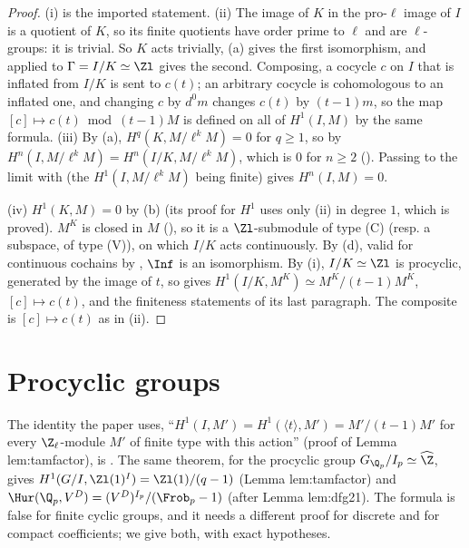 \begin{proof}
(i) is the imported statement. (ii) The image of $K$ in the pro-$\ell$ image of $I$ is a quotient of $K$, so its finite quotients have order prime to $\ell$
and are $\ell$-groups: it is trivial. So $K$ acts trivially, (a) gives the first isomorphism, and
 applied to $\Gamma=I/K\simeq\Zl$ gives the second. Composing, a cocycle $c$ on $I$ that is inflated from $I/K$ is sent to
$c(t)$; an arbitrary cocycle is cohomologous to an inflated one, and changing $c$ by $d^0m$ changes $c(t)$ by $(t-1)m$, so the map $[c]\mapsto c(t)\bmod(t-1)M$ is
defined on all of $H^1(I,M)$ by the same formula. (iii) By (a), $H^q(K,M/\ell^kM)=0$ for $q\ge1$, so by
 $H^n(I,M/\ell^kM)=H^n(I/K,M/\ell^kM)$, which is $0$ for $n\ge2$ (). Passing to the limit
with  (the $H^1(I,M/\ell^kM)$ being finite) gives $H^n(I,M)=0$.

(iv) $H^1(K,M)=0$ by (b) (its proof for $H^1$ uses only (ii) in degree $1$, which is proved). $M^K$ is closed in $M$
(), so it is a $\Zl$-submodule of type (C) (resp. a subspace, of type (V)), on which $I/K$ acts continuously. By
(d), valid for continuous cochains by , $\Inf$ is an isomorphism. By (i), $I/K\simeq\Zl$ is procyclic,
generated by the image of $t$, so  gives $H^1(I/K,M^K)\simeq M^K/(t-1)M^K$, $[c]\mapsto c(t)$, and the finiteness statements of its last
paragraph. The composite is $[c]\mapsto c(t)$ as in (ii).
\end{proof}

\section{Procyclic groups}\label{sec:cohomology:procyclic}

The identity the paper uses, ``$H^1(I,M')=H^1(\langle t\rangle,M')=M'/(t-1)M'$ for every $\Z_\ell$-module $M'$ of finite type with this action'' (proof of Lemma
lem:tamfactor), is . The same theorem, for the procyclic group $G_{\Q_p}/I_p\simeq\widehat\Z$, gives
$H^1(G/I,\Zl(1)^I)=\Zl(1)/(q-1)$ (Lemma lem:tamfactor) and $\Hur(\Q_p,V^D)=(V^D)^{I_p}/(\Frob_p-1)$ (after Lemma lem:dfg21). The formula is false for finite
cyclic groups, and it needs a different proof for discrete and for compact coefficients; we give both, with exact hypotheses.


